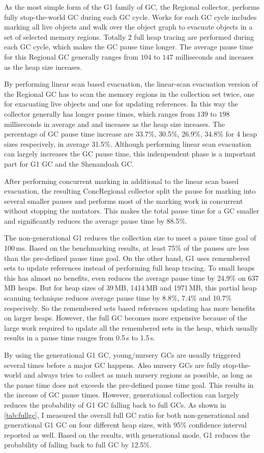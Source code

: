 As the most simple form of the G1 family of GC, the Regional collector, performs fully
stop-the-world GC during each GC cycle. Works for each GC cycle includes marking all
live objects and walk over the object graph to evacuate objects in a set of selected memory
regions. Totally 2 full heap tracing are performed during each GC cycle, which makes the GC
pause time longer. The average pause time for this Regional GC generally ranges from $104$ to $147$
milliseconds and inceases as the heap size inceases.

By performing linear scan based evacuation, the linear-scan evacuation version of the Regional
GC has to scan the memory regions in the collection set twice, one for exacuating live objects and
one for updating references. In this way the collector generally has longer pause times,
which ranges from $139$ to $198$ milliseconds in average and and inceases as the heap size inceases.
The percentage of GC pause time increase are 33.7\%, 30.5\%, 26.9\%, 34.8\% for 4 heap sizes
respecively, in average 31.5\%.
Although performing linear scan evacuation can largely increases the GC pause time,
this indenpendent phase is a important part for G1 GC and the Shenandoah GC.

After performing concurrent marking in additional to the linear scan based evacuation,
the resulting ConcRegional collector split the pause for marking into several smaller
pauses and performs most of the marking work in concurrent without stopping the mutators.
This makes the total pause time for a GC smaller and significantly reduces the average
pause time by 88.5\%.

The non-generational G1 reduces the collection size to meet a pause time goal of 100\,ms.
Based on the benchmarking results, at least 75\% of the pauses are less than the pre-defined
pause time goal. On the other hand, G1 uses remembered sets to update references
instead of performing full heap tracing.
To small heaps this has almost no benefits, even reduces the average pause time by
24.9\% on 637\,MB heaps. But for heap sizes of 39\,MB, 1414\,MB and 1971\,MB, this
partial heap scanning technique reduces average pause time by 8.8\%, 7.4\% and 10.7\%
respecively. So the remembered sets based references updating has more benefits on
larger heaps. However, the full GC becomes more expensive because of the large work required
to update all the remembered sets in the heap, which usually results in a pause time
ranges from 0.5\,s to 1.5\,s.

By using the generational G1 GC, young/nursery GCs are usually triggered several times
before a major GC happens. Also nursery GCs are fully stop-the-world and always tries
to collect as much nursery regions as possible, as long as the pause time does not exceeds
the pre-defined pause time goal. This results in the incease of GC pause times.
However, generational collection can largely reduces the probability of G1 GC falling
back to full GCs. As shown in \ref{tab:fullgc}, I measured the overall full GC ratio
for both non-generational and generational G1 GC on four different heap sizes,
with 95\% confidence interval reported as well.
Based on the results, with generational mode, G1 reduces the
probability of falling back to full GC by 12.5\%.

